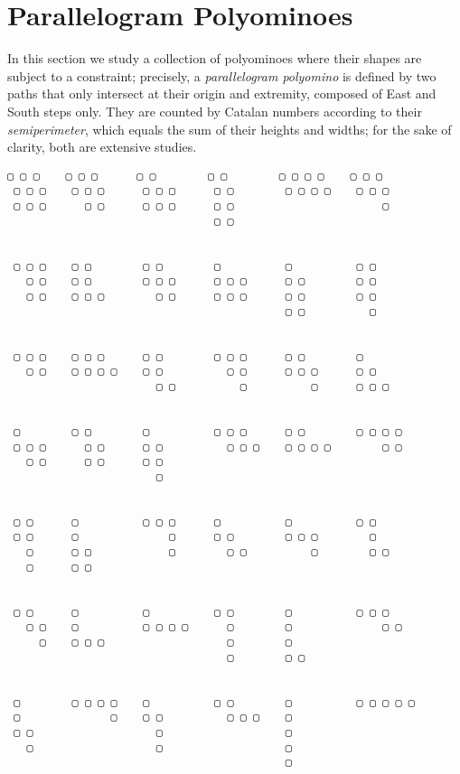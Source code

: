 \section{Parallelogram Polyominoes}

In this section we study a collection of polyominoes where their shapes are
subject to a constraint; precisely, a \textit{parallelogram polyomino} is
defined by two paths that only intersect at their origin and extremity,
composed of East and South steps only. They are counted by Catalan numbers
according to their \textit{semiperimeter}, which equals the sum of their
heights and widths; for the sake of clarity, both
\citep{delest1993enumeration,delest:enumeration:pp} are extensive studies.

\begin{table}
\begin{Verbatim}[baselinestretch=0.5]
 ▢ ▢ ▢    ▢ ▢ ▢      ▢ ▢        ▢ ▢        ▢ ▢ ▢ ▢    ▢ ▢ ▢
 ▢ ▢ ▢    ▢ ▢ ▢      ▢ ▢ ▢      ▢ ▢        ▢ ▢ ▢ ▢    ▢ ▢ ▢
 ▢ ▢ ▢      ▢ ▢      ▢ ▢ ▢      ▢ ▢                       ▢
                                ▢ ▢


 ▢ ▢ ▢    ▢ ▢        ▢ ▢        ▢          ▢          ▢ ▢
   ▢ ▢    ▢ ▢        ▢ ▢ ▢      ▢ ▢ ▢      ▢ ▢        ▢ ▢
   ▢ ▢    ▢ ▢ ▢        ▢ ▢      ▢ ▢ ▢      ▢ ▢        ▢ ▢
                                           ▢ ▢          ▢


 ▢ ▢ ▢    ▢ ▢ ▢      ▢ ▢        ▢ ▢ ▢      ▢ ▢        ▢
   ▢ ▢    ▢ ▢ ▢ ▢    ▢ ▢          ▢ ▢      ▢ ▢ ▢      ▢ ▢
                       ▢ ▢          ▢          ▢      ▢ ▢ ▢


 ▢        ▢ ▢        ▢          ▢ ▢ ▢      ▢ ▢        ▢ ▢ ▢ ▢
 ▢ ▢ ▢      ▢ ▢      ▢ ▢          ▢ ▢ ▢    ▢ ▢ ▢ ▢        ▢ ▢
   ▢ ▢      ▢ ▢      ▢ ▢
                       ▢


 ▢ ▢      ▢          ▢ ▢ ▢      ▢          ▢          ▢ ▢
 ▢ ▢      ▢              ▢      ▢ ▢        ▢ ▢ ▢        ▢
   ▢      ▢ ▢            ▢        ▢ ▢          ▢        ▢ ▢
   ▢      ▢ ▢


 ▢ ▢      ▢          ▢          ▢ ▢        ▢          ▢ ▢ ▢
   ▢ ▢    ▢          ▢ ▢ ▢ ▢      ▢        ▢              ▢ ▢
     ▢    ▢ ▢ ▢                   ▢        ▢
                                  ▢        ▢ ▢


 ▢        ▢ ▢ ▢ ▢    ▢          ▢ ▢        ▢          ▢ ▢ ▢ ▢ ▢
 ▢              ▢    ▢ ▢          ▢ ▢ ▢    ▢
 ▢ ▢                   ▢                   ▢
   ▢                   ▢                   ▢
                                           ▢
\end{Verbatim}
\caption{Parallelogram Polyominoes with semiperimeter $6$,
which are $42$ in total, the $6$th Catalan number.}
\label{tbl:parallelogram:polyominoes}
\end{table}

